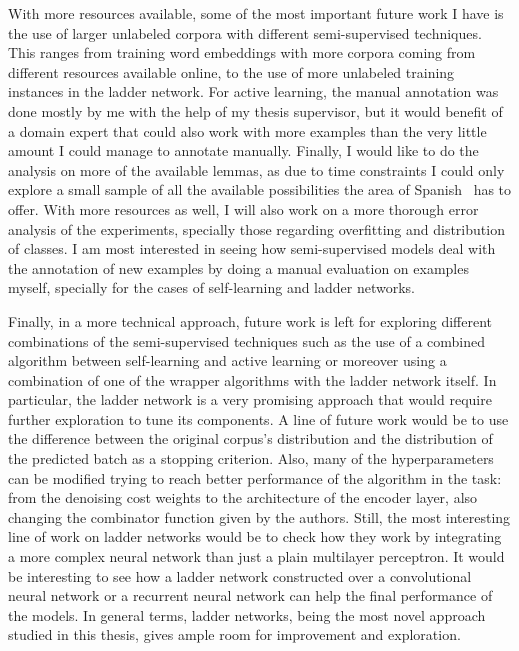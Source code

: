 With more resources available, some of the most important future work I have is
the use of larger unlabeled corpora with different semi-supervised techniques.
This ranges from training word embeddings with more corpora coming from
different resources available online, to the use of more unlabeled training
instances in the ladder network. For active learning, the manual annotation was
done mostly by me with the help of my thesis supervisor, but it would benefit
of a domain expert that could also work with more examples than the very little
amount I could manage to annotate manually. Finally, I would like to do the
analysis on more of the available lemmas, as due to time constraints I could
only explore a small sample of all the available possibilities the area of
Spanish \vsd~has to offer. With more resources as well, I will also work on a
more thorough error analysis of the experiments, specially those regarding
overfitting and distribution of classes. I am most interested in seeing how
semi-supervised models deal with the annotation of new examples by doing a
manual evaluation on examples myself, specially for the cases of self-learning
and ladder networks.

Finally, in a more technical approach, future work is left for exploring
different combinations of the semi-supervised techniques such as the use of a
combined algorithm between self-learning and active learning or moreover using
a combination of one of the wrapper algorithms with the ladder network itself.
In particular, the ladder network is a very promising approach that would
require further exploration to tune its components. A line of future work would
be to use the difference between the original corpus's distribution and the
distribution of the predicted batch as a stopping criterion. Also, many of the
hyperparameters can be modified trying to reach better performance of the
algorithm in the task: from the denoising cost weights to the architecture of
the encoder layer, also changing the combinator function given by the authors.
Still, the most interesting line of work on ladder networks would be to check
how they work by integrating a more complex neural network than just a plain
multilayer perceptron. It would be interesting to see how a ladder network
constructed over a convolutional neural network or a recurrent neural network
can help the final performance of the models. In general terms, ladder
networks, being the most novel approach studied in this thesis, gives ample
room for improvement and exploration.
